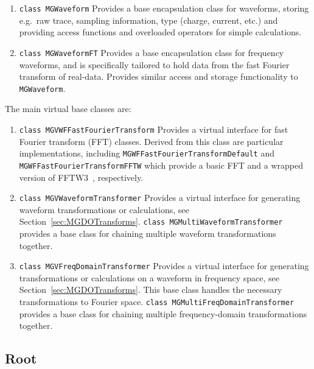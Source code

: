 			\begin{enumerate}  
				\item[]{\lstinline!class MGWaveform!} Provides a
base encapsulation class for waveforms, storing e.g.~raw trace, sampling
information, type (charge, current, etc.) and providing access functions and
overloaded operators for simple calculations. 
				\item[]{\lstinline!class MGWaveformFT!} Provides a base
encapsulation class for frequency waveforms, and is specifically tailored to
hold data from the fast Fourier transform of real-data.  Provides similar
access and storage functionality to \lstinline!MGWaveform!. 
			\end{enumerate}  
The main virtual base classes are:
			\begin{enumerate}  
				\item[]{\lstinline!class MGVWFFastFourierTransform!}  Provides
a virtual interface for fast Fourier transform (FFT) classes.  Derived from
this class are particular implementations, including
\lstinline!MGWFFastFourierTransformDefault! and
\lstinline!MGWFFastFourierTransformFFTW! which provide a basic FFT and a
wrapped version of FFTW3~\cite{FFTW05}, respectively. 
				\item[]{\lstinline!class MGVWaveformTransformer!}  Provides a
virtual interface for generating waveform transformations or calculations, see
Section~\ref{sec:MGDOTransforms}.  \lstinline!class MGMultiWaveformTransformer!
provides a base class for chaining multiple waveform transformations together. 
				\item[]{\lstinline!class MGVFreqDomainTransformer!}  Provides
a virtual interface for generating transformations or calculations on a
waveform in frequency space, see Section~\ref{sec:MGDOTransforms}.  This base
class handles the necessary transformations to Fourier space.
\lstinline!class MGMultiFreqDomainTransformer! provides a base class for chaining
multiple frequency-domain transformations together. 

			\end{enumerate}  
		\subsection{Root}
			
